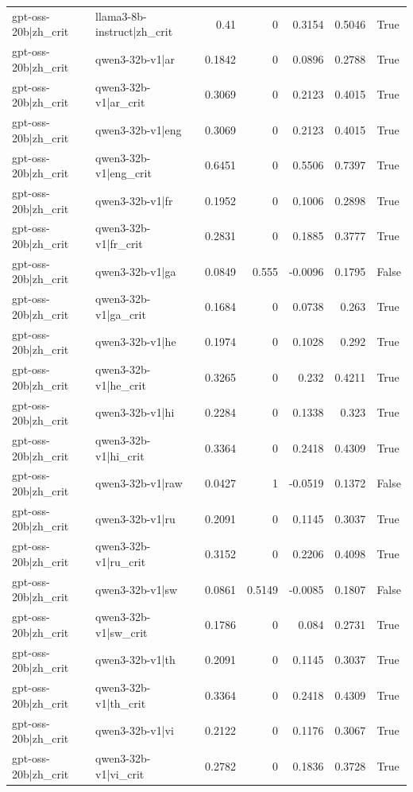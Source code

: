 \begin{table}
\begin{tabular}{l l r r r r l}
gpt-oss-20b|zh_crit & llama3-8b-instruct|zh_crit & 0.41 & 0 & 0.3154 & 0.5046 & True \\
gpt-oss-20b|zh_crit & qwen3-32b-v1|ar & 0.1842 & 0 & 0.0896 & 0.2788 & True \\
gpt-oss-20b|zh_crit & qwen3-32b-v1|ar_crit & 0.3069 & 0 & 0.2123 & 0.4015 & True \\
gpt-oss-20b|zh_crit & qwen3-32b-v1|eng & 0.3069 & 0 & 0.2123 & 0.4015 & True \\
gpt-oss-20b|zh_crit & qwen3-32b-v1|eng_crit & 0.6451 & 0 & 0.5506 & 0.7397 & True \\
gpt-oss-20b|zh_crit & qwen3-32b-v1|fr & 0.1952 & 0 & 0.1006 & 0.2898 & True \\
gpt-oss-20b|zh_crit & qwen3-32b-v1|fr_crit & 0.2831 & 0 & 0.1885 & 0.3777 & True \\
gpt-oss-20b|zh_crit & qwen3-32b-v1|ga & 0.0849 & 0.555 & -0.0096 & 0.1795 & False \\
gpt-oss-20b|zh_crit & qwen3-32b-v1|ga_crit & 0.1684 & 0 & 0.0738 & 0.263 & True \\
gpt-oss-20b|zh_crit & qwen3-32b-v1|he & 0.1974 & 0 & 0.1028 & 0.292 & True \\
gpt-oss-20b|zh_crit & qwen3-32b-v1|he_crit & 0.3265 & 0 & 0.232 & 0.4211 & True \\
gpt-oss-20b|zh_crit & qwen3-32b-v1|hi & 0.2284 & 0 & 0.1338 & 0.323 & True \\
gpt-oss-20b|zh_crit & qwen3-32b-v1|hi_crit & 0.3364 & 0 & 0.2418 & 0.4309 & True \\
gpt-oss-20b|zh_crit & qwen3-32b-v1|raw & 0.0427 & 1 & -0.0519 & 0.1372 & False \\
gpt-oss-20b|zh_crit & qwen3-32b-v1|ru & 0.2091 & 0 & 0.1145 & 0.3037 & True \\
gpt-oss-20b|zh_crit & qwen3-32b-v1|ru_crit & 0.3152 & 0 & 0.2206 & 0.4098 & True \\
gpt-oss-20b|zh_crit & qwen3-32b-v1|sw & 0.0861 & 0.5149 & -0.0085 & 0.1807 & False \\
gpt-oss-20b|zh_crit & qwen3-32b-v1|sw_crit & 0.1786 & 0 & 0.084 & 0.2731 & True \\
gpt-oss-20b|zh_crit & qwen3-32b-v1|th & 0.2091 & 0 & 0.1145 & 0.3037 & True \\
gpt-oss-20b|zh_crit & qwen3-32b-v1|th_crit & 0.3364 & 0 & 0.2418 & 0.4309 & True \\
gpt-oss-20b|zh_crit & qwen3-32b-v1|vi & 0.2122 & 0 & 0.1176 & 0.3067 & True \\
gpt-oss-20b|zh_crit & qwen3-32b-v1|vi_crit & 0.2782 & 0 & 0.1836 & 0.3728 & True \\

\end{tabular}
\end{table}
